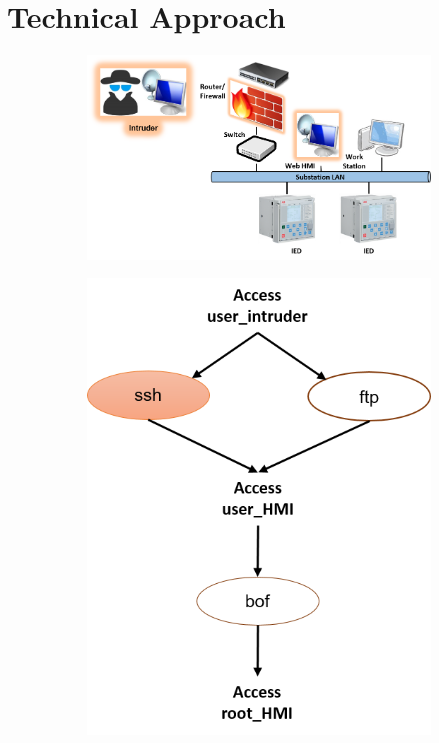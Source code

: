 \section{Technical Approach}\label{sec:technical}
\begin{figure}[htbp]
	\centering
	\begin{subfigure}{0.3\textwidth}
	\includegraphics[width=\textwidth]{A-model.png}
	\caption{}\label{sfig:model-A}
	\end{subfigure}
	\begin{subfigure}{0.14\textwidth}
	\includegraphics[width=\textwidth]{A-graph.png}

\end{subfigure}
\end{figure}
